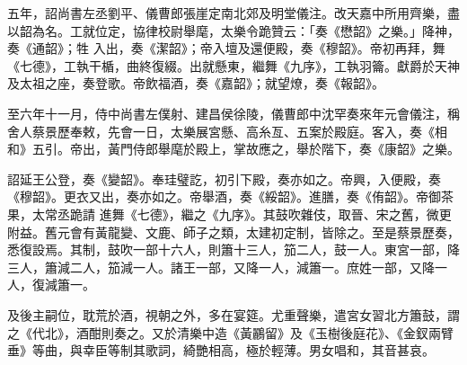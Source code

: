 \begin{pinyinscope}
 五年，詔尚書左丞劉平、儀曹郎張崖定南北郊及明堂儀注。改天嘉中所用齊樂，盡以韶為名。工就位定，協律校尉舉麾，太樂令跪贊云：「奏《懋韶》之樂。」降神，奏《通韶》；牲
 入出，奏《潔韶》；帝入壇及還便殿，奏《穆韶》。帝初再拜，舞《七德》，工執干楯，曲終復綴。出就懸東，繼舞《九序》，工執羽籥。獻爵於天神及太祖之座，奏登歌。帝飲福酒，奏《嘉韶》；就望燎，奏《報韶》。



 至六年十一月，侍中尚書左僕射、建昌侯徐陵，儀曹郎中沈罕奏來年元會儀注，稱舍人蔡景歷奉敕，先會一日，太樂展宮懸、高糸亙、五案於殿庭。客入，奏《相和》五引。帝出，黃門侍郎舉麾於殿上，掌故應之，舉於階下，奏《康韶》之樂。



 詔延王公登，奏《變韶》。奉珪璧訖，初引下殿，奏亦如之。帝興，入便殿，奏《穆韶》。更衣又出，奏亦如之。帝舉酒，奏《綏韶》。進膳，奏《侑韶》。帝御茶果，太常丞跪請
 進舞《七德》，繼之《九序》。其鼓吹雜伎，取晉、宋之舊，微更附益。舊元會有黃龍變、文鹿、師子之類，太建初定制，皆除之。至是蔡景歷奏，悉復設焉。其制，鼓吹一部十六人，則簫十三人，笳二人，鼓一人。東宮一部，降三人，簫減二人，笳減一人。諸王一部，又降一人，減簫一。庶姓一部，又降一人，復減簫一。



 及後主嗣位，耽荒於酒，視朝之外，多在宴筵。尤重聲樂，遣宮女習北方簫鼓，謂之《代北》，酒酣則奏之。又於清樂中造《黃鸝留》及《玉樹後庭花》、《金釵兩臂垂》等曲，與幸臣等制其歌詞，綺艷相高，極於輕薄。男女唱和，其音甚哀。



\end{pinyinscope}